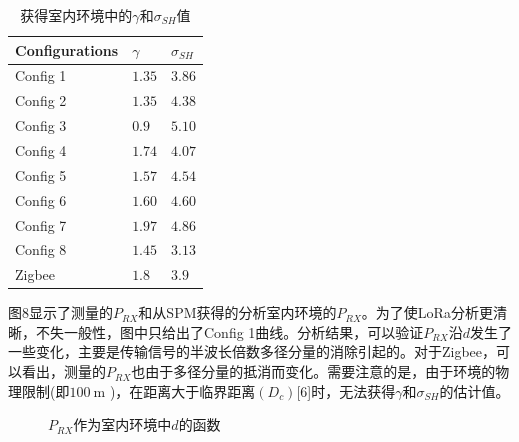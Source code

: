 \documentclass[10pt]{ctexart}
\begin{document}
\begin{table}[H]
  \centering
  \renewcommand{\tablename}{表}
  \caption{获得室内环境中的$\gamma$和$\sigma_{SH}$值}
  \begin{tabular}{l|l|l}
  \hline
  Configurations & $\gamma$ & $\sigma_{SH}$ \\
  \hline
  Config 1 & $1.35$ & $3.86$ \\
  \hline
  Config 2 & $1.35$ & $4.38$ \\
  \hline
  Config 3 & $0.9$ & $5.10$ \\
  \hline
  Config 4 & $1.74$ & $4.07$ \\
  \hline
  Config 5 & $1.57$ & $4.54$ \\
  \hline
  Config 6 & $1.60$ & $4.60$ \\
  \hline
  Config 7 & $1.97$ & $4.86$ \\
  \hline
  Config 8 & $1.45$ & $3.13$ \\
  \hline
  Zigbee & $1.8$ & $3.9$ \\
  \hline
  \end{tabular}
\end{table}

图8显示了测量的$P_{RX}$和从SPM获得的分析室内环境的$P_{RX}$。为了使LoRa分析更清晰，不失一般性，图中只给出了Config 1曲线。分析结果，可以验证$P_{RX}$沿$d$发生了一些变化，主要是传输信号的半波长倍数多径分量的消除引起的。对于Zigbee，可以看出，测量的$P_{RX}$也由于多径分量的抵消而变化。需要注意的是，由于环境的物理限制(即$100\mathrm{~m}$ )，在距离大于临界距离$\left(D_{c}\right)$[6]时，无法获得$\gamma$和$\sigma_{SH}$的估计值。

\begin{figure}[H]
  \renewcommand{\figurename}{图}
  \caption{$P_{R X}$作为室内环境中$d$的函数}
\end{figure}
\end{document}
